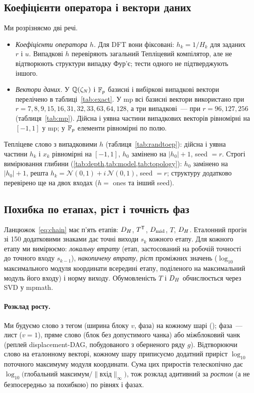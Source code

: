 \documentclass[11pt]{article}
\theoremstyle{plain}
\newcommand{\abs}[1]{\lvert #1\rvert}
\newcommand{\norm}[1]{\lVert #1\rVert}
\begin{document}
\subsection{Коефіцієнти оператора і вектори даних}\label{sec:inputs}
Ми розрізняємо дві речі.
\begin{itemize}
\item \emph{Коефіцієнти оператора $h$.} Для DFT вони фіксовані: $h_k=1/H_k$ для заданих $r$ і $u$. Випадкові $h$ перевіряють загальний Тепліцевий компілятор, але не відтворюють структури випадку Фур'є; тести одного не підтверджують іншого.
\item \emph{Вектори даних.} У $\mathbb{Q}(\zeta_N)$ і $\mathbb{F}_p$ базисні і вибіркові випадкові вектори перелічено в таблиці~\ref{tab:exact}. У mp всі базисні вектори використано при $r=7,8,9,15,16,31,32,33,63,64,128$, а три випадкові~--- при $r=96,127,256$ (таблиця~\ref{tab:mp}). Дійсна і уявна частини випадкових векторів рівномірні на $[-1,1]$ у mp; у $\mathbb{F}_p$ елементи рівномірні по полю.
\end{itemize}
Тепліцеве слово з випадковими $h$ (таблиця~\ref{tab:randtoep}): дійсна і уявна частини $h_k$ і $x_k$ рівномірні на $[-1,1]$, $h_0$ замінено на $\abs{h_0}+1$, seed $=r$. Строгі вимірювання глибини (\cref{tab:depth,tab:model,tab:topology}): $h_0$ замінено на $\abs{h_0}+1$, решта $h_k=\mathcal N(0,1)+i\,\mathcal N(0,1)$, seed $=r$; структуру додатково перевірено ще на двох входах ($h=$ ones та інший seed).

\subsection{Похибка по етапах, ріст і точність фаз}\label{sec:stagewise}
Ланцюжок~\eqref{eq:chain} має п'ять етапів: $D_H$, $T^{\mathsf{T}}$, $D_{\mathrm{mid}}$, $T$, $D_H$. Еталонний прогін зі 150 додатковими знаками дає точні виходи $s_k$ кожного етапу. Для кожного етапу ми вимірюємо: \emph{локальну втрату} (етап, застосований на робочій точності до точного входу $s_{k-1}$), \emph{накопичену втрату}, \emph{ріст} проміжних значень ($\log_{10}$ максимального модуля координати всередині етапу, поділеного на максимальний модуль його входу) і норму виходу. Обумовленість $T$ і $D_H$ обчислюється через SVD у mpmath.

\paragraph{Розклад росту.}
Ми будуємо слово з тегом (ширина блоку $v$, фаза) на кожному шарі (); фаза~--- лист ($v=1$), пряме слово (блок без допустимого чанка) або міжблоковий чанк (реплей displacement-DAG, побудованого з оберненого ряду $g$). Відтворюючи слово на еталонному векторі, кожному шару приписуємо додатний приріст $\log_{10}$ поточного максимуму модуля координати. Сума цих приростів телескопічно дає $\log_{10}\bigl(\text{глобальний максимум}/\norm{\text{вхід}}_\infty\bigr)$, тож розклад адитивний за \emph{ростом} (а не безпосередньо за похибкою) по рівнях і фазах.
\end{document}
